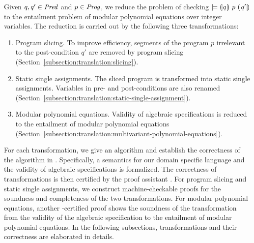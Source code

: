
Given $q, q' \in \mathit{Pred}$ and $p \in \mathit{Prog}$, we reduce the problem of checking
$\models {(\!|}{q}{|\!)}~{p}~{(\!|}{q'}{|\!)}$ to the entailment problem of modular
polynomial equations over integer variables. The reduction is carried out by
the following three transformations:
\begin{enumerate}
\item Program slicing. To improve efficiency, segments of the program $p$
  irrelevant to the post-condition $q'$ are removed by program slicing 
  (Section~\ref{subsection:translation:slicing}). 
\item Static single assignments. The sliced program is transformed
  into static single assignments. Variables in pre- and
  post-conditions are also renamed
  (Section~\ref{subsection:translation:static-single-assignment}).
\item Modular polynomial equations. Validity of algebraic specifications
  is reduced to the entailment of modular polynomial equations
  (Section~\ref{subsection:translation:multivariant-polynomial-equations}). 
\end{enumerate}

For each transformation, we give an algorithm and establish the
correctness of the algorithm in \coq. Specifically, a semantics
for our domain specific language and the validity of algebraic
specifications is formalized. The correctness of
transformations is then certified by the proof assistant \coq.
For program slicing and static single assignments, we
construct machine-checkable proofs for the soundness and completeness
of the two transformations. For modular polynomial equations, another
\coq-certified proof shows the soundness of the transformation
from the validity of the algebraic specification to the entailment of 
modular polynomial equations. In the following subsections,
transformations and their correctness are elaborated in details.  